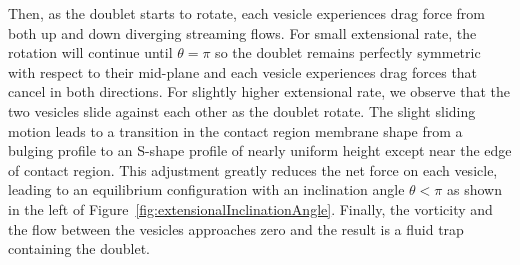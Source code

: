 \documentclass[prf,superscriptaddress,showpacs]{revtex4-1}
\begin{document}
Then, as the doublet
starts to rotate, each vesicle experiences drag force from both up and down diverging streaming flows.
For small extensional rate, the rotation will continue until $\theta = \pi$ so the doublet remains perfectly symmetric
with respect to their mid-plane  and each vesicle experiences drag forces that cancel in both directions.
For slightly higher extensional rate, we observe that the two vesicles slide against each other as the doublet rotate.
The slight sliding motion leads to a transition in the contact region membrane shape from a bulging profile to 
an S-shape profile of nearly uniform height except near the edge of contact region.
This adjustment greatly reduces the net force on each vesicle, leading to an equilibrium configuration with an inclination angle $\theta < \pi$ as shown in 
the left of Figure~\ref{fig:extensionalInclinationAngle}.  Finally,
the vorticity and the flow between the vesicles approaches zero and the
result is a fluid trap containing the doublet.
\end{document}

